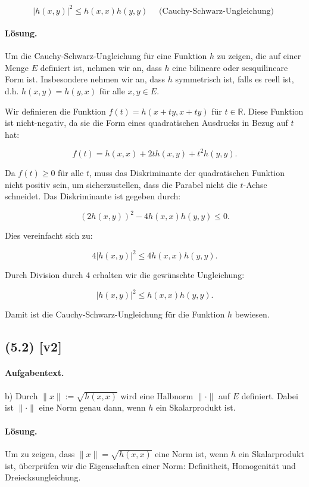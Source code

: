 \documentclass[11pt,a4paper]{article}
\begin{document}
$$
|h(x, y)|^2 \leq h(x, x) h(y, y) \quad \text { (Cauchy-Schwarz-Ungleichung) }
$$

\paragraph{Lösung.}
Um die Cauchy-Schwarz-Ungleichung für eine Funktion \( h \) zu zeigen, die auf einer Menge \( E \) definiert ist, nehmen wir an, dass \( h \) eine bilineare oder sesquilineare Form ist. Insbesondere nehmen wir an, dass \( h \) symmetrisch ist, falls es reell ist, d.h. \( h(x, y) = h(y, x) \) für alle \( x, y \in E \).

Wir definieren die Funktion \( f(t) = h(x + ty, x + ty) \) für \( t \in \mathbb{R} \). Diese Funktion ist nicht-negativ, da sie die Form eines quadratischen Ausdrucks in Bezug auf \( t \) hat:

\[
f(t) = h(x, x) + 2t h(x, y) + t^2 h(y, y).
\]

Da \( f(t) \geq 0 \) für alle \( t \), muss das Diskriminante der quadratischen Funktion nicht positiv sein, um sicherzustellen, dass die Parabel nicht die \( t \)-Achse schneidet. Das Diskriminante ist gegeben durch:

\[
(2h(x, y))^2 - 4h(x, x)h(y, y) \leq 0.
\]

Dies vereinfacht sich zu:

\[
4|h(x, y)|^2 \leq 4h(x, x)h(y, y).
\]

Durch Division durch 4 erhalten wir die gewünschte Ungleichung:

\[
|h(x, y)|^2 \leq h(x, x)h(y, y).
\]

Damit ist die Cauchy-Schwarz-Ungleichung für die Funktion \( h \) bewiesen.


\subsection*{(5.2) [v2]}
\paragraph{Aufgabentext.}
b) Durch $\|x\|:=\sqrt{h(x, x)}$ wird eine Halbnorm $\|\cdot\|$ auf $E$ definiert. Dabei ist $\|\cdot\|$ eine Norm genau dann, wenn $h$ ein Skalarprodukt ist.

\paragraph{Lösung.}
Um zu zeigen, dass $\|x\| = \sqrt{h(x, x)}$ eine Norm ist, wenn $h$ ein Skalarprodukt ist, überprüfen wir die Eigenschaften einer Norm: Definitheit, Homogenität und Dreiecksungleichung.
\end{document}
